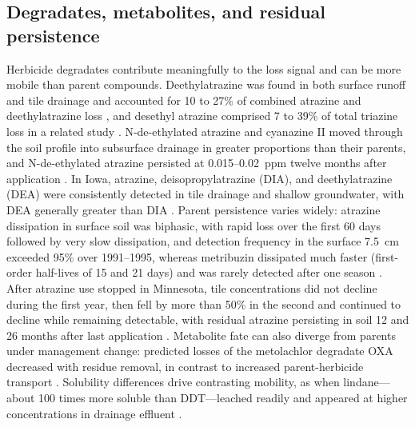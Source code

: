 \documentclass[11pt]{article}
\begin{document}
\subsection{Degradates, metabolites, and residual persistence}
Herbicide degradates contribute meaningfully to the loss signal and can be more mobile than parent compounds. Deethylatrazine was found in both surface runoff and tile drainage and accounted for 10 to 27\% of combined atrazine and deethylatrazine loss \parencite{GAYNOR1995}, and desethyl atrazine comprised 7 to 39\% of total triazine loss in a related study \parencite{Gaynor2001}. N-de-ethylated atrazine and cyanazine II moved through the soil profile into subsurface drainage in greater proportions than their parents, and N-de-ethylated atrazine persisted at 0.015--0.02~ppm twelve months after application \parencite{MUIR1978}. In Iowa, atrazine, deisopropylatrazine (DIA), and deethylatrazine (DEA) were consistently detected in tile drainage and shallow groundwater, with DEA generally greater than DIA \parencite{JAYACHANDRAN1994}. Parent persistence varies widely: atrazine dissipation in surface soil was biphasic, with rapid loss over the first 60 days followed by very slow dissipation, and detection frequency in the surface 7.5~cm exceeded 95\% over 1991--1995, whereas metribuzin dissipated much faster (first-order half-lives of 15 and 21 days) and was rarely detected after one season \parencite{Moorman1999}. After atrazine use stopped in Minnesota, tile concentrations did not decline during the first year, then fell by more than 50\% in the second and continued to decline while remaining detectable, with residual atrazine persisting in soil 12 and 26 months after last application \parencite{BUHLER1993}. Metabolite fate can also diverge from parents under management change: predicted losses of the metolachlor degradate OXA decreased with residue removal, in contrast to increased parent-herbicide transport \parencite{Shipitalo2016}. Solubility differences drive contrasting mobility, as when lindane---about 100 times more soluble than DDT---leached readily and appeared at higher concentrations in drainage effluent \parencite{JOHNSTON1967}.
\end{document}
